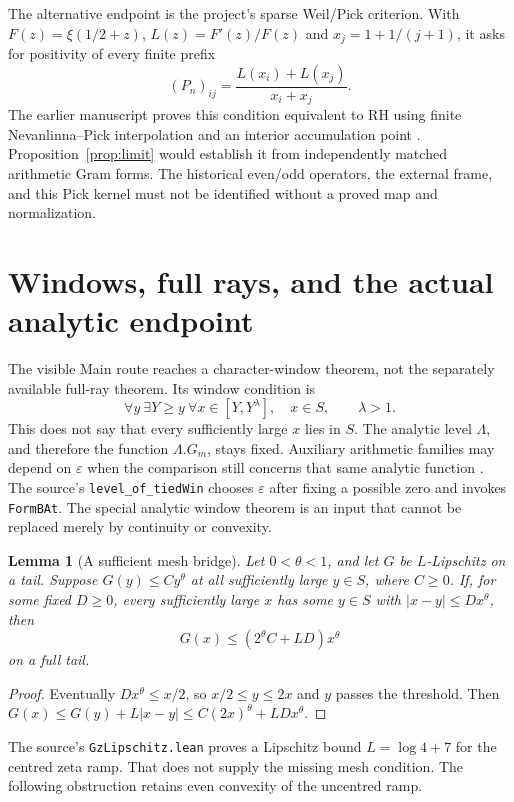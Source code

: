 \documentclass[11pt,letterpaper]{article}
\newtheorem{lemma}[theorem]{Lemma}
\theoremstyle{definition}
\theoremstyle{remark}
\numberwithin{equation}{section}
\begin{document}
The alternative endpoint is the project's sparse Weil/Pick criterion. With $F(z)=\xi(1/2+z)$, $L(z)=F'(z)/F(z)$ and $x_j=1+1/(j+1)$, it asks for positivity of every finite prefix
\[
 (P_n)_{ij}=\frac{L(x_i)+L(x_j)}{x_i+x_j}.
\]
The earlier manuscript proves this condition equivalent to RH using finite Nevanlinna--Pick interpolation and an interior accumulation point \cite{project}. Proposition~\ref{prop:limit} would establish it from independently matched arithmetic Gram forms. The historical even/odd operators, the external frame, and this Pick kernel must not be identified without a proved map and normalization.

\section{Windows, full rays, and the actual analytic endpoint}

The visible Main route reaches a character-window theorem, not the separately available full-ray theorem. Its window condition is
\[
 \forall y\ \exists Y\ge y\ \forall x\in[Y,Y^\lambda],\quad x\in S,
 \qquad\lambda>1.
\]
This does not say that every sufficiently large $x$ lies in $S$. The analytic level $\Lambda$, and therefore the function $\Lambda.G_m$, stays fixed. Auxiliary arithmetic families may depend on $\varepsilon$ when the comparison still concerns that same analytic function \cite{window}. The source's \texttt{level\_of\_tiedWin} chooses $\varepsilon$ after fixing a possible zero and invokes \texttt{FormBAt}. The special analytic window theorem is an input that cannot be replaced merely by continuity or convexity.

\begin{lemma}[A sufficient mesh bridge]\label{lem:mesh}
Let $0<\theta<1$, and let $G$ be $L$-Lipschitz on a tail. Suppose $G(y)\le Cy^\theta$ at all sufficiently large $y\in S$, where $C\ge0$. If, for some fixed $D\ge0$, every sufficiently large $x$ has some $y\in S$ with $|x-y|\le Dx^\theta$, then
\[
 G(x)\le(2^\theta C+LD)x^\theta
\]
on a full tail.
\end{lemma}
\begin{proof}
Eventually $Dx^\theta\le x/2$, so $x/2\le y\le2x$ and $y$ passes the threshold. Then $G(x)\le G(y)+L|x-y|\le C(2x)^\theta+LDx^\theta$.
\end{proof}

The source's \texttt{GzLipschitz.lean} proves a Lipschitz bound $L=\log4+7$ for the centred zeta ramp. That does not supply the missing mesh condition. The following obstruction retains even convexity of the uncentred ramp.
\end{document}
